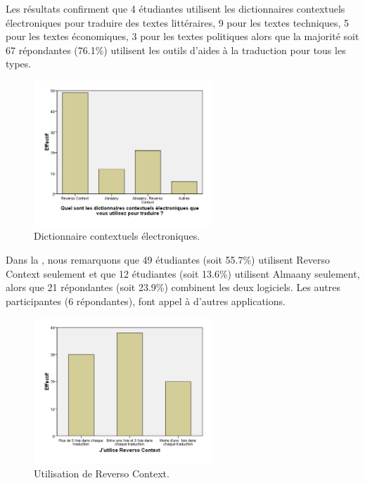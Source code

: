 \documentclass{textolivre}
\begin{document}
Les résultats confirment que 4 étudiantes utilisent les dictionnaires contextuels électroniques pour traduire des textes littéraires, 9 pour les textes techniques, 5 pour les textes économiques, 3 pour les textes politiques alors que la majorité soit 67 répondantes (76.1\%) utilisent les outils d’aides à la traduction pour tous les types.
\begin{figure}[htbp]
\centering
\includegraphics[width=0.6\textwidth]{fig05.png}
\caption{Dictionnaire contextuels électroniques.}
\label{fig05}
\end{figure}

Dans la , nous remarquons que 49 étudiantes (soit 55.7\%) utilisent Reverso Context seulement et que 12 étudiantes (soit 13.6\%) utilisent Almaany seulement, alors que 21 répondantes (soit 23.9\%) combinent les deux logiciels. Les autres participantes (6 répondantes), font appel à d’autres applications.
\begin{figure}[htbp]
\centering
\includegraphics[width=0.6\textwidth]{fig06.png}
\caption{Utilisation de Reverso Context.}
\label{fig06}
\end{figure}
\end{document}
